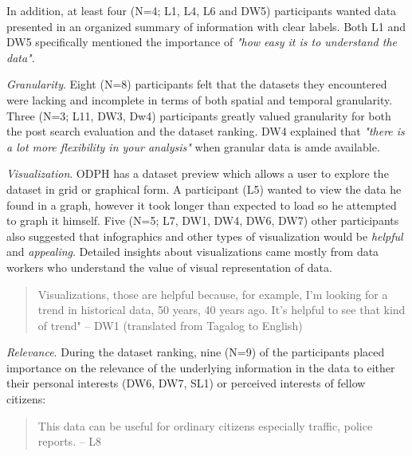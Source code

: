 \documentclass{sigchi}
\begin{document}
In addition, at least four (N=4; L1, L4, L6 and DW5) participants wanted data presented in an organized summary of information with clear labels. Both L1 and DW5 specifically mentioned the importance of \textit{"how easy it is to understand the data"}.



\textit{Granularity}. Eight (N=8) participants felt that the datasets they encountered were lacking and incomplete in terms of both spatial and temporal granularity. Three (N=3; L11, DW3, Dw4) participants greatly valued granularity for both the post search evaluation and the dataset ranking. DW4 explained that \textit{"there is a lot more flexibility in your analysis"} when granular data is amde available.

\textit{Visualization}. ODPH has a dataset preview which allows a user to explore the dataset in grid or graphical form. A participant (L5) wanted to view the data he found in a graph, however it took longer than expected to load so he attempted to graph it himself. Five (N=5; L7, DW1, DW4, DW6, DW7) other participants also suggested that infographics and other types of visualization would be \textit{helpful} and \textit{appealing}. Detailed insights about visualizations came mostly from data workers who understand the value of visual representation of data. 
\begin{quote}
Visualizations, those are helpful because, for example, I'm looking for a trend in historical data, 50 years, 40 years ago. It's helpful to see that kind of trend" -- DW1 (translated from Tagalog to English)
\end{quote}

\textit{Relevance}. During the dataset ranking, nine (N=9) of the participants placed importance on the relevance of the underlying information in the data to either their personal interests (DW6, DW7, SL1) or perceived interests of fellow citizens:
\begin{quote}
  This data can be useful for ordinary citizens especially traffic, police reports. -- L8
\end{quote}
\end{document}
